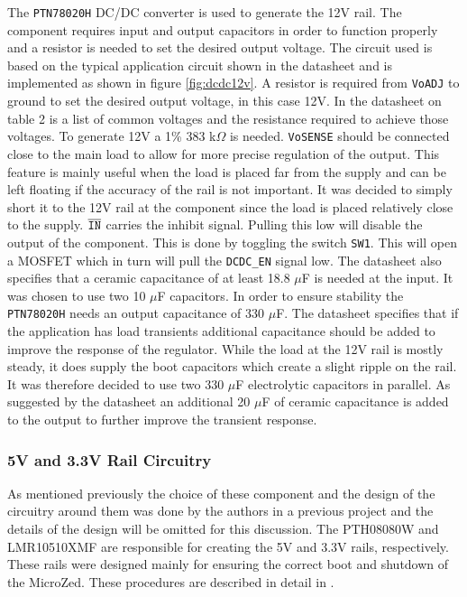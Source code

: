 The \texttt{PTN78020H} DC/DC converter is used to generate the 12V rail. 
The component requires input and output capacitors in order to function properly and a resistor is needed to set the desired output voltage. 
The circuit used is based on the typical application circuit shown in the datasheet \cite{PTN78020H} and is implemented as shown in figure \ref{fig:dcdc12v}.
A resistor is required from \texttt{VoADJ} to ground to set the desired output voltage, in this case 12V.
In the datasheet on table 2 is a list of common voltages and the resistance required to achieve those voltages.
To generate 12V a 1\% 383 k$\Omega$ is needed.
\texttt{VoSENSE} should be connected close to the main load to allow for more precise regulation of the output.
This feature is mainly useful when the load is placed far from the supply and can be left floating if the accuracy of the rail is not important.
It was decided to simply short it to the 12V rail at the component since the load is placed relatively close to the supply.
$\overline{\text{\texttt{IN}}}$ carries the inhibit signal.
Pulling this low will disable the output of the component.
This is done by toggling the switch \texttt{SW1}. 
This will open a MOSFET which in turn will pull the \texttt{DCDC\_EN} signal low.
The datasheet also specifies that a ceramic capacitance of at least 18.8 $\mu$F is needed at the input. 
It was chosen to use two 10 $\mu$F capacitors.
In order to ensure stability the \texttt{PTN78020H} needs an output capacitance of 330 $\mu$F.
The datasheet specifies that if the application has load transients additional capacitance should be added to improve the response of the regulator.
While the load at the 12V rail is mostly steady, it does supply the boot capacitors which create a slight ripple on the rail.
It was therefore decided to use two 330 $\mu$F electrolytic capacitors in parallel.
As suggested by the datasheet an additional 20 $\mu$F of ceramic capacitance is added to the output to further improve the transient response.\\

\subsubsection{5V and 3.3V Rail Circuitry} %
\label{subsub:pth08080w}
As mentioned previously the choice of these component and the design of the circuitry around them was done by the authors in a previous project \cite{isaswarm} and the details of the design will be omitted for this discussion.
The PTH08080W and LMR10510XMF are responsible for creating the 5V and 3.3V rails, respectively.
These rails were designed mainly for ensuring the correct boot and shutdown of the MicroZed.
These procedures are described in detail in \cite{isaswarm}.


